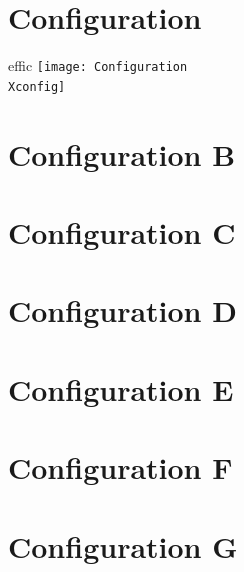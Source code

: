 \documentclass[a4paper,twoside]{report}
\newcounter{N}
\newcounter{I}
\newcommand{\newconfig}[1]{%


\chapter*{Configuration \Xconfig}

\renewcommand{\Xconfig}{#1}

\newpage
\phantom{a}

\newpage
\phantom{a}

\newpage
\phantom{a}

\newpage
\phantom{a}
}
\begin{document}
\newpage
\phantom{a}

\newpage
\phantom{a}

\newpage
\phantom{a}



\chapter*{Configuration \Xconfig}
\renewcommand{\Xconfig}{B}

\begin{dynamiccontents*}{effic}
\texttt{[image: Configuration\\Xconfig]}
\end{dynamiccontents*}

\newpage
\phantom{a}


\newpage
\phantom{a}

\newpage
\phantom{a}


\newconfig{C}

\newconfig{D}

\newconfig{E}

\newconfig{F}

\newconfig{G}

\newconfig{H}
\end{document}
